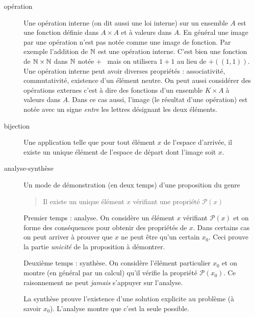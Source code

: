 \begin{description}
\item[opération]Une opération interne (on dit aussi une loi interne) sur un ensemble $A$ est une fonction définie dans $A\times A$ et à valeurs dans $A$.\newline
En général une image par une opération n'est pas notée comme une image de fonction. Par exemple l'addition de $\mathbb{N}$ est une opération interne. C'est bien une fonction de $\mathbb{N} \times \mathbb{N}$ dans  $\mathbb{N}$ notée \og $+$\fg~ mais on utilisera $1+1$ au lieu de $+((1,1))$.\newline
Une opération interne peut avoir diverses propriétés : associativité, commutativité, existence d'un élément neutre.\newline
On peut aussi considérer des opérations externes c'est à dire des fonctions d'un ensemble $K\times A$ à valeurs dans $A$. Dans ce cas aussi, l'image (le résultat d'une opération) est notée avec un signe \emph{entre} les lettres désignant les deux éléments.

\item[bijection] Une application telle que pour tout élément $x$ de l'espace d'arrivée, il existe un unique élément de l'espace de départ dont l'image soit $x$.

\item[analyse-synthèse] Un mode de démonstration (en deux temps) d'une proposition du genre
\begin{quote}
 Il existe un unique élément $x$ vérifiant une propriété $\mathcal P (x)$
\end{quote}
Premier temps : analyse. On considère un élément $x$ vérifiant $\mathcal P (x)$ et on forme des conséquences pour obtenir des propriétés de $x$. Dans certains cas on peut arriver à prouver que $x$ ne peut être qu'un certain $x_0$. \newline
Ceci prouve la partie \emph{unicité} de la proposition à démontrer.

Deuxième temps : synthèse. On considère l'élément particulier $x_0$ et on montre (en général par un calcul) qu'il vérifie la propriété $\mathcal P (x_0)$. Ce raisonnement ne peut \emph{jamais} s'appuyer sur l'analyse. 

La synthèse prouve l'existence d'une solution explicite au problème (à savoir $x_0$). L'analyse montre que c'est la seule possible.


\end{description}

